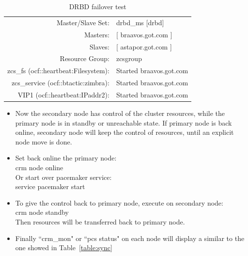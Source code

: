 \documentclass[a4paper, 12pt]{book}
\begin{document}
\begin{table}
  \centering
  \begin{tabular}{ | r l | }
    \hline
      Master/Slave Set: 		& 	drbd\_ms [drbd]\\
      Masters: 					& [ braavos.got.com ]\\
      Slaves: 					& [ astapor.got.com ]\\
      Resource Group: 			& zcsgroup\\
      zcs\_fs (ocf::heartbeat:Filesystem): & Started braavos.got.com\\
      zcs\_service (ocf::btactic:zimbra):  & Started braavos.got.com\\
      VIP1 (ocf::heartbeat:IPaddr2):       & Started braavos.got.com\\
    \hline
  \end{tabular}
\caption{DRBD failover test}
\label{table:failover}
\end{table}



\begin{itemize}
	\item Now the secondary node has control of the cluster resources, while the primary node is in standby or unreachable state. If primary node is back online, secondary node will keep the control of resources, until an explicit node move is done.\\
\end{itemize}


\begin{itemize}
	\item Set back online the primary node:\\
			crm node online\\
		  Or start over pacemaker service:\\
		  	service pacemaker start\\
\end{itemize}


\begin{itemize}
	\item To give the control back to primary node, execute on secondary node:\\
			crm node standby\\
		  Then resources will be transferred back to primary node.\\
\end{itemize}


\begin{itemize}
	\item Finally ``crm\_mon" or ``pcs status" on each node will display a similar to the one showed in Table~\ref{table:sync}\\
\end{itemize}
\end{document}
